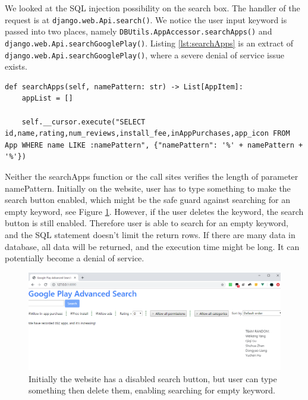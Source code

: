 \documentclass[12pt, a4paper]{article}
\newcommand{\code}[1]{\texttt{#1}}
\begin{document}
We looked at the SQL injection possibility on the search box. The handler of the request is at \code{django.web.Api.search()}. We notice the user input keyword is passed into two places, namely \code{DBUtils.AppAccessor.\linebreak[0]searchApps()} and \code{django.web.Api.searchGooglePlay()}. Listing \ref{lst:searchApps} is an extract of \code{django.web.Api.searchGooglePlay()}, where a severe denial of service issue exists.

\begin{lstlisting}[frame=tb, caption=DBUtils.AppAccessor.searchApps(), label=lst:searchApps]
def searchApps(self, namePattern: str) -> List[AppItem]:
	appList = []

	self.__cursor.execute("SELECT id,name,rating,num_reviews,install_fee,inAppPurchases,app_icon FROM App WHERE name LIKE :namePattern", {"namePattern": '%' + namePattern + '%'})
\end{lstlisting}

Neither the searchApps function or the call sites verifies the length of parameter namePattern. Initially on the website, user has to type something to make the search button enabled, which might be the safe guard against searching for an empty keyword, see Figure \ref{fig:website-gray-buton}. However, if the user deletes the keyword, the search button is still enabled. Therefore user is able to search for an empty keyword, and the SQL statement doesn't limit the return rows. If there are many data in database, all data will be returned, and the execution time might be long. It can potentially become a denial of service.


\begin{figure}[ht]
\centering
\includegraphics[width=\textwidth]{website-gray-button.png}
\caption{Initially the website has a disabled search button, but user can type something then delete them, enabling searching for empty keyword.}
\label{fig:website-gray-buton}
\end{figure}
\end{document}

